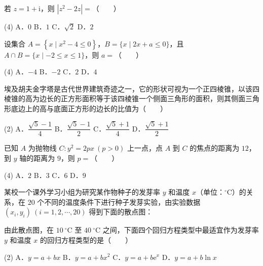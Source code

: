\begin{question}
若 $z=1+\mathrm i$，则 $\left|z^{2}-2z\right|=$\mbox{（　　）}

\begin{gkopts}(4)
\task A．$0$
\task B．$1$
\task C．$\sqrt2$
\task D．$2$
\end{gkopts}

\end{question}
\begin{question}
设集合 $A=\left\{x\mid x^{2}-4\le0\right\}$，$B=\{x\mid2x+a\le0\}$，且 $A\cap B=\{x\mid-2\le x\le1\}$，则 $a=$\mbox{（　　）}

\begin{gkopts}(4)
\task A．$-4$
\task B．$-2$
\task C．$2$
\task D．$4$
\end{gkopts}

\end{question}
\begin{question}
埃及胡夫金字塔是古代世界建筑奇迹之一，它的形状可视为一个正四棱锥，以该四棱锥的高为边长的正方形面积等于该四棱锥一个侧面三角形的面积，则其侧面三角形底边上的高与底面正方形的边长的比值为\mbox{（　　）}

\begin{gkopts}(2)
\task A．$\dfrac{\sqrt5-1}4$
\task B．$\dfrac{\sqrt5-1}2$
\task C．$\dfrac{\sqrt5+1}4$
\task D．$\dfrac{\sqrt5+1}2$
\end{gkopts}

\end{question}
\begin{question}
已知 $A$ 为抛物线 $C:y^{2}=2px\ (p>0)$ 上一点，点 $A$ 到 $C$ 的焦点的距离为 $12$，到 $y$ 轴的距离为 $9$，则 $p=$\mbox{（　　）}

\begin{gkopts}(4)
\task A．$2$
\task B．$3$
\task C．$6$
\task D．$9$
\end{gkopts}

\Needspace{0.4\textheight}
\end{question}
\begin{question}
某校一个课外学习小组为研究某作物种子的发芽率 $y$ 和温度 $x$（单位：$^\circ\mathrm C$）的关系，在 $20$ 个不同的温度条件下进行种子发芽实验，由实验数据 $\left(x_i,y_i\right)\ (i=1,2,\cdots,20)$ 得到下面的散点图：
\nopagebreak[4]
\begin{center}\end{center}
\nopagebreak[4]
由此散点图，在 $10\ ^\circ\mathrm C$ 至 $40\ ^\circ\mathrm C$ 之间，下面四个回归方程类型中最适宜作为发芽率 $y$ 和温度 $x$ 的回归方程类型的是\mbox{（　　）}

\begin{gkopts}(2)
\task A．$y=a+bx$
\task B．$y=a+bx^{2}$
\task C．$y=a+b\mathrm e^{x}$
\task D．$y=a+b\ln x$
\end{gkopts}

\end{question}
